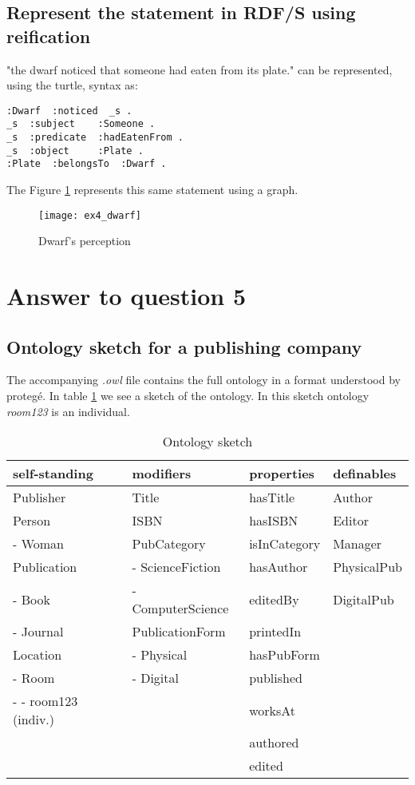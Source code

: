 \documentclass[a4paper,12pt]{article}
\begin{document}
\subsection[Dwarf]{Represent the statement in RDF/S using reification}
"the dwarf noticed that someone had eaten from its plate." can be represented,
using the turtle, syntax as:
\begin{Verbatim}[samepage=true]
:Dwarf  :noticed  _s .
_s  :subject    :Someone .
_s  :predicate  :hadEatenFrom .
_s  :object     :Plate .
:Plate  :belongsTo  :Dwarf .
\end{Verbatim}
The Figure \ref{dwarf} represents this same statement using a graph.
\begin{figure}[!htp]
\centering
\texttt{[image: ex4\_dwarf]}
\caption{Dwarf's perception}
\label{dwarf}
\end{figure}

\section[Question 5]{Answer to question 5}

\subsection[Publishing]{Ontology sketch for a publishing company}
The accompanying \emph{.owl} file contains the full ontology in a format
understood by proteg\'e.  In table \ref{sketch} we see a sketch of the
ontology.  In this sketch ontology \emph{room123} is an individual.
\begin{table}[!htp]
\centering
\begin{tabular}{|l|l|l|l|}
\hline
self-standing        & modifiers         & properties   & definables  \\
\hline \hline
Publisher            & Title             & hasTitle     & Author      \\
Person               & ISBN              & hasISBN      & Editor      \\
- Woman              & PubCategory       & isInCategory & Manager     \\
Publication          & - ScienceFiction  & hasAuthor    & PhysicalPub \\
- Book               & - ComputerScience & editedBy     & DigitalPub  \\
- Journal            & PublicationForm   & printedIn    &\\
Location             & - Physical        & hasPubForm   &\\
- Room               & - Digital         & published    &\\
- - room123 (indiv.) &                   & worksAt      &\\
                     &                   & authored     &\\
                     &                   & edited       &\\
\hline
\end{tabular}
\caption{Ontology sketch}
\label{sketch}
\end{table}
\end{document}
